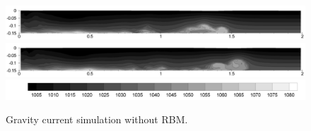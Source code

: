 \begin{figure}[htbp]
\begin{center}
\includegraphics[scale=0.35]{../figures/Exp3-CASE1-dt0.005/OneDomain/17.pdf}
\includegraphics[scale=0.35]{../figures/Exp3-CASE1-dt0.005/OneDomain/19.pdf}
\includegraphics[scale=0.35]{../figures/Exp3-CASE1-dt0.005/legend.pdf}
    \caption{Gravity current simulation without RBM.}
    \label{fig:RBM-GC-1Domain}
  \end{center}
\end{figure}


\cp

